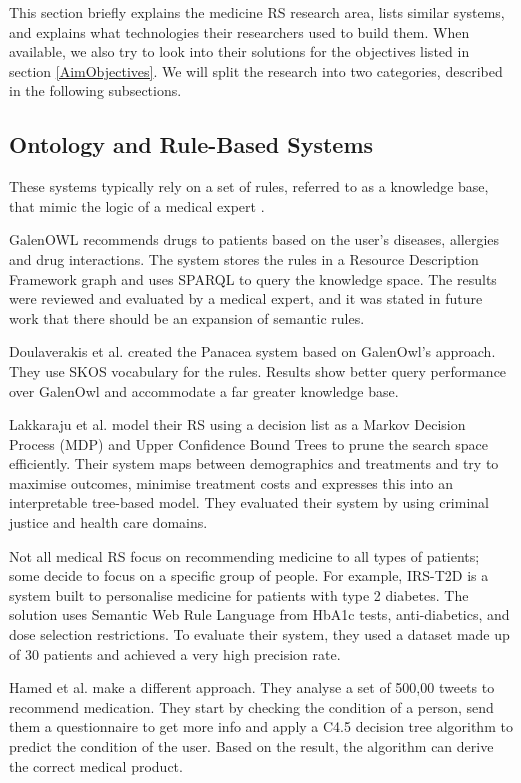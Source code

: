 This section briefly explains the medicine RS research area, lists similar
systems, and explains what technologies their researchers used to build
them. When available, we also try to look into their solutions for the
objectives listed in section \ref{AimObjectives}. We will split the
research into two categories, described in the following subsections.

\subsection{Ontology and Rule-Based Systems}

These systems typically rely on a set of rules, referred to as a knowledge
base, that mimic the logic of a medical expert \cite{Stark2019}.

GalenOWL \cite{Doulaverakis2012} recommends drugs to patients based on the
user's diseases, allergies and drug interactions. The system stores the
rules in a Resource Description Framework graph and uses SPARQL to query
the knowledge space. The results were reviewed and evaluated by a medical
expert, and it was stated in future work that there should be an expansion
of semantic rules. 

Doulaverakis et al. created the Panacea \cite{Doulaverakis2014} system based on
GalenOwl's approach. They use SKOS vocabulary for the rules. Results show
better query performance over GalenOwl and accommodate a far greater knowledge
base.


Lakkaraju et al.\cite{pmlr-v54-lakkaraju17a} model their RS using a decision list
as a Markov Decision Process (MDP) and Upper Confidence Bound Trees to
prune the search space efficiently. Their system maps between demographics
and treatments and try to maximise outcomes, minimise treatment costs and
expresses this into an interpretable tree-based model. They evaluated
their system by using criminal justice and health care domains. 


Not all medical RS focus on recommending medicine to all types of
patients; some decide to focus on a specific group of people. For example,
IRS-T2D \cite{Mahmoud2016} is a system built to personalise medicine for
patients with type 2 diabetes. The solution uses Semantic Web Rule Language
from HbA1c  tests, anti-diabetics, and dose selection restrictions. To evaluate
their system, they used a dataset made up of 30 patients and achieved a very
high precision rate. 

Hamed et al. \cite{Hamed2012} make a different approach. They analyse a set of
500,00 tweets to recommend medication. They start by checking the condition of
a person, send them a questionnaire to get more info and apply a C4.5 decision
tree algorithm to predict the condition of the user. Based on the result, the
algorithm can derive the correct medical product. 

